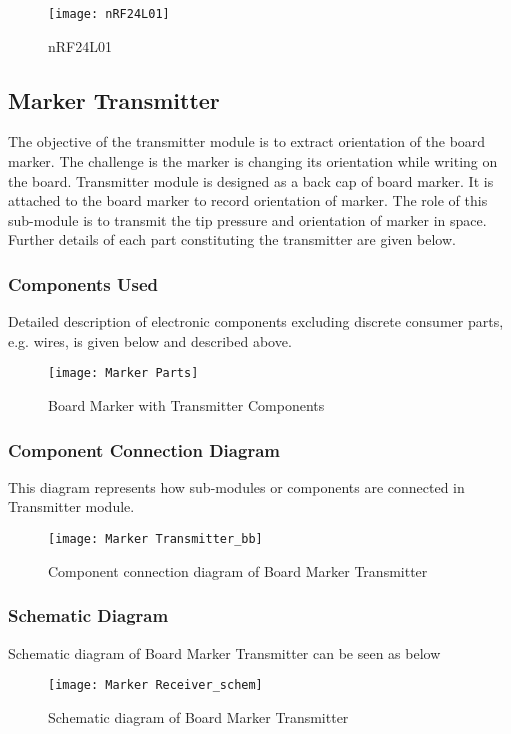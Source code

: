 \begin{figure}[h]
  \centering
  \texttt{[image: nRF24L01]}
  \caption{nRF24L01}
\end{figure}

\subsection{Marker Transmitter}
The objective of the transmitter module is to extract orientation of the board marker. The challenge is the marker is changing its orientation while writing on the board. Transmitter module is designed as a back cap of board marker. It is attached to the board marker to record orientation of marker. The role of this sub-module is to transmit the tip pressure and orientation of marker in space. Further details of each part constituting the transmitter are given below.

\subsubsection{Components Used}
Detailed description of electronic components excluding discrete consumer parts, e.g. wires, is given below and described above.
\newpage
\begin{figure}[h]
  \centering
  \texttt{[image: Marker Parts]}
  \caption{Board Marker with Transmitter Components}
\end{figure}

\subsubsection{Component Connection Diagram}
This diagram represents how sub-modules or components are connected in Transmitter module.
\begin{figure}[h]
  \centering
  \texttt{[image: Marker Transmitter\_bb]}
  \caption{Component connection diagram of Board Marker Transmitter}
\end{figure}

\subsubsection{Schematic Diagram}
Schematic diagram of Board Marker Transmitter can be seen as below

\begin{figure}[h]
  \centering
  \texttt{[image: Marker Receiver\_schem]}
  \caption{Schematic diagram of Board Marker Transmitter}
\end{figure}


